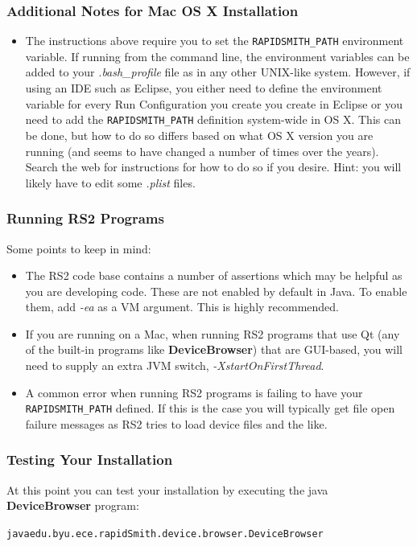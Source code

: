 \documentclass[12pt]{article}
\newcommand{\env}[1]{{\texttt{#1}}}
\newcommand{\fil}[1]{{\em #1}}
\newcommand{\opt}[1]{{\em #1}}
\newcommand{\pgm}[1]{{\textbf{#1}}}
\newenvironment{code}{\begin{center} \begin{minipage}{6in} \noindent \begin{alltt}}{\end{alltt} \end{minipage} \end{center}}
\begin{document}
\subsubsection{Additional Notes for Mac OS X Installation}
\begin{itemize}
  \item The instructions above require you to set the \env{RAPIDSMITH\_PATH}
  environment variable.  If running from the command line, the environment
  variables can be added to your \fil{.bash\_profile} file as in any other
  UNIX-like system.  However, if using an IDE such as Eclipse, you either need to define
  the environment variable for every Run Configuration you create you create in
  Eclipse or you need to add the \env{RAPIDSMITH\_PATH} definition system-wide
  in OS X.
  This can be done, but how to do so differs based on what OS X version you are
  running (and seems to have changed a number of times over the years).  Search
  the web for instructions for how to do so if you desire.   Hint: you will
  likely have to edit some \fil{.plist} files.
\end{itemize}

\subsubsection{Running RS2 Programs}
Some points to keep in mind:
\begin{itemize}
  \item The RS2 code base contains a number of assertions which may be helpful  
  as you are developing code.  These are not enabled by default in Java.  To
  enable them, add \opt{-ea} as a VM argument.  This is highly recommended.
  \item If you are running on a Mac, when running RS2 programs that use Qt  (any
  of the built-in programs like \pgm{DeviceBrowser}) that are GUI-based, you
  will need to supply an extra JVM switch, \opt{-XstartOnFirstThread}.
  \item A common error when running RS2 programs is failing to have your
  \env{RAPIDSMITH\_PATH} defined.  If this is the case you will typically get
  file open failure messages as RS2 tries to load device files and the like.
\end{itemize}

\subsubsection{Testing Your Installation}
\noindent At this point you can test your installation by executing the java
\pgm{DeviceBrowser} program: 
\vspace{-0.15in}  \begin{code}
java edu.byu.ece.rapidSmith.device.browser.DeviceBrowser
\end{code}    
\end{document}
